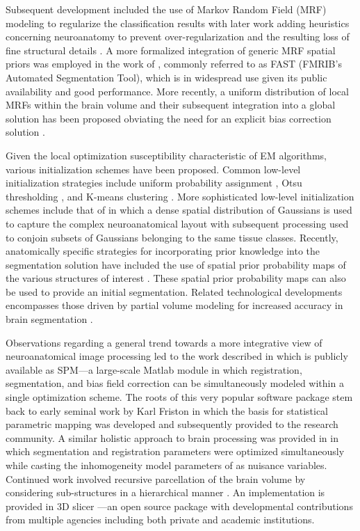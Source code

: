 \documentclass[11pt,english]{article}
\begin{document}
Subsequent development included the use of Markov Random Field (MRF)  modeling \citep{Geman1984}
to regularize the classification results \citep{Held1997} with later work adding heuristics concerning neuroanatomy to prevent 
over-regularization and the resulting loss of fine structural details \citep{Leemput1999,Leemput1999a}.  
A more formalized integration of generic MRF spatial priors was employed in the work of \cite{Zhang2001}, 
commonly referred to as FAST (FMRIB's Automated Segmentation Tool), which is in widespread use
given its public availability and good performance.  More recently, a uniform distribution of local MRFs within the brain volume and their subsequent integration into a global solution has been proposed obviating the need for an 
explicit bias correction solution \citep{Scherrer2009}.  

Given the local optimization susceptibility characteristic of EM algorithms, various initialization schemes have been proposed.  Common low-level initialization strategies include uniform
probability assignment \citep{Wells1996}, Otsu thresholding \citep{Zhang2001}, and K-means clustering \citep{Pappas1992}.  More sophisticated low-level initialization schemes include that of \cite{Greenspan2006} in which a dense spatial distribution of Gaussians is used to capture the complex neuroanatomical layout with subsequent processing used to conjoin subsets of Gaussians belonging to the same tissue classes.  Recently, anatomically specific strategies for incorporating prior knowledge  into the segmentation solution have included the use of spatial prior probability maps  of the various structures of interest \citep{Leemput1999a,Marroquin2002,Ashburner2005}.  These spatial prior probability maps can also be used to provide an
initial segmentation.   Related technological developments encompasses those driven by partial volume modeling for increased accuracy in brain segmentation \citep{Ruan2000,Ballester2002,Leemput2003}.

Observations regarding a general trend towards a more integrative view 
of neuroanatomical image processing led to the work described in \cite{Ashburner2005} which is
publicly available as SPM---a large-scale Matlab module in which registration, segmentation, and bias field 
correction can be simultaneously modeled within a single optimization scheme. The roots of this very popular 
software package stem back to early seminal work by Karl Friston in which the basis for statistical parametric mapping was developed \citep{Friston1990} and subsequently provided to the research community. A similar holistic approach
to brain processing was provided in \cite{Pohl2006} in which segmentation
and registration parameters were optimized simultaneously while casting the inhomogeneity model parameters
of \cite{Wells1996} as nuisance variables.  Continued work involved recursive parcellation of the brain volume by considering sub-structures in a hierarchical manner \citep{Pohl2007}.  An implementation is provided in  3D slicer \cite{Pieper2006}---an open source package with developmental contributions from multiple agencies including both private and academic institutions.
\end{document}
